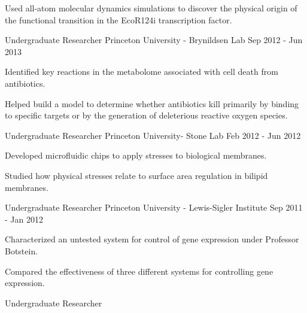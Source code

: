\begin{cventries}
    {
      \begin{cvitems} %
        \item Used all-atom molecular dynamics simulations to discover the physical origin of the functional transition in the EcoR124i transcription factor.
      \end{cvitems}
    }
\ifoutdated
  \cventry
    {Undergraduate Researcher} %
    {Princeton University - Brynildsen Lab} %
    {} %
    {Sep 2012 - Jun 2013} %
    {
      \begin{cvitems} %
        \item Identified key reactions in the \ecoli metabolome associated with cell death from antibiotics.
        \item Helped build a model to determine whether antibiotics kill primarily by binding to specific targets or by the generation of deleterious reactive oxygen species.
      \end{cvitems}
    }
  \cventry
    {Undergraduate Researcher} %
    {Princeton University- Stone Lab} %
    {} %
    {Feb 2012 - Jun 2012} %
    {
      \begin{cvitems} %
        \item Developed microfluidic chips to apply stresses to biological membranes.
        \item Studied how physical stresses relate to surface area regulation in bilipid membranes.
      \end{cvitems}
    }
  \cventry
    {Undergraduate Researcher} %
    {Princeton University - Lewis-Sigler Institute} %
    {} %
    {Sep 2011 - Jan 2012} %
    {
      \begin{cvitems} %
        \item Characterized an untested system for control of gene expression under Professor Botstein.
        \item Compared the effectiveness of three different systems for controlling gene expression.
      \end{cvitems}
    }
  \cventry
    {Undergraduate Researcher} %

\end{cventries}
